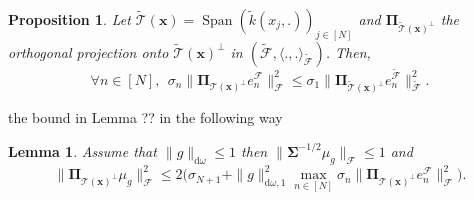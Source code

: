 \documentclass[twoside,11pt]{book}
\newtheorem{proposition}{Proposition}
\newtheorem{lemma}{Lemma}
\numberwithin{theorem}{chapter}
\numberwithin{definition}{chapter}
\numberwithin{proposition}{chapter}
\numberwithin{corollary}{chapter}
\numberwithin{example}{chapter}
\numberwithin{lemma}{chapter}
\DeclareMathOperator{\Span}{\mathrm{Span}}
\DeclareMathOperator{\DPP}{\mathrm{DPP}}
\DeclareMathOperator{\EX}{\mathbb{E}}
\begin{document}

\begin{proposition}\label{prop:strong_kernel_perturbation_inequality}
Let $ \tilde{\mathcal{T}}(\bm{x}) = \Span \left( \tilde{k}(x_{j},.) \right)_{j \in [N]}$ and $\bm{\Pi}_{\tilde{\mathcal{T}}(\bm{x})^{\perp}}$ the orthogonal projection onto $\tilde{\mathcal{T}}(\bm{x})^{\perp}$ in $(\tilde{\mathcal{F}}, \langle .,.\rangle_{\tilde{\mathcal{F}}})$. Then,
\begin{equation}\label{eq:kernel_perturbation_inequality}
	\forall n \in [N], \:\: \sigma_{n} \|\bm{\Pi}_{\mathcal{T}(\bm{x})^{\perp}} e_{n}^{\mathcal{F}}\|_{\mathcal{F}}^{2} \leq \sigma_{1}   \|\bm{\Pi}_{\tilde{\mathcal{T}}(\bm{x})^{\perp}} e_{n}^{\tilde{\mathcal{F}}}\|_{\tilde{\mathcal{F}}}^{2}.
\end{equation}
\end{proposition}


the bound in Lemma ?? in the following way



\begin{lemma}\label{lemma:strong_approximation_error_spectral_bound}
Assume that $\|g\|_{\mathrm{d}\omega} \leq 1$ then $\| \bm{\Sigma}^{-1/2} \mu_{g} \|_{\mathcal{F}} \leq 1$ and
\begin{equation}
	\|\bm{\Pi}_{\mathcal{T}(\bm{x})^{\perp}}\mu_{g}\|^{2}_{\mathcal{F}} \leq 2 \bigg( \sigma_{N+1} + \|g\|_{\mathrm{d}\omega,1}^2  \max\limits_{ n \in [N]} \sigma_{n}\|\bm{\Pi}_{\mathcal{T}(\bm{x})^{\perp}} e_{n}^{\mathcal{F}}\|_{\mathcal{F}}^{2} \bigg) .
\label{e:boundingOrthogonalProjection}
\end{equation}
\end{lemma}
\end{document}
